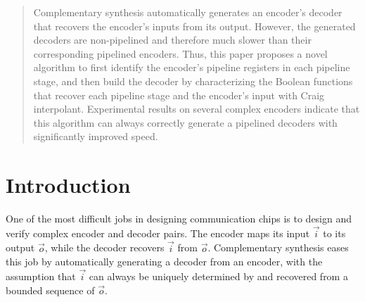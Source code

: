 \documentclass[conference]{IEEEtran}
\begin{document}




\maketitle

\begin{abstract}
Complementary synthesis automatically generates an encoder's decoder
that recovers the encoder's inputs from its output.
However,
the generated decoders are non-pipelined 
and therefore much slower than their corresponding pipelined encoders.
Thus,
this paper proposes a novel algorithm to first identify the encoder's pipeline registers in each pipeline stage,
and then build the decoder by characterizing the Boolean functions that recover each pipeline stage and the encoder's input
with Craig interpolant.
Experimental results on several complex encoders indicate that
this algorithm can always correctly generate a pipelined decoders with significantly
improved speed.
\end{abstract}





%
\IEEEpeerreviewmaketitle



\section{Introduction}\label{sec_intro}
One of the most difficult jobs in designing communication
 chips is to design and verify complex encoder and decoder pairs.
The encoder maps its input $\vec{i}$ to its output  $\vec{o}$,
while the decoder recovers $\vec{i}$ from $\vec{o}$.
Complementary synthesis 
\cite{ShenICCAD09,ShenTCAD10,ShenTCAD11,ShenICCAD11,ShenTCAD12,LiuICCAD11,LiuTCAD12,TuDAC13,QinTODAES15}
eases this job by
automatically generating a decoder from an encoder,
with the assumption that $\vec{i}$ can always be
uniquely determined by and recovered from a bounded sequence of $\vec{o}$.
\end{document}
